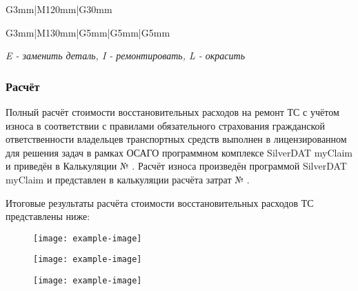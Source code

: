\begin{longtable}{G{3mm}|M{120mm}|G{30mm}}
\begin{longtable}{G{3mm}|M{130mm}|G{5mm}|G{5mm}|G{5mm}}
	 
	
	\textit{E - заменить деталь, I - ремонтировать, L - окрасить}
	
	
	\renewcommand\baselinestretch{1.2}\small\normalsize

\subsubsection{ Расчёт}
    
\indent Полный расчёт стоимости восстановительных расходов на ремонт ТС с учётом износа в соответствии с правилами обязательного страхования гражданской ответственности владельцев транспортных средств выполнен в  лицензированном для решения задач в рамках ОСАГО программном комплексе   SilverDAT myClaim и приведён в Калькуляции № \NomerDoc.
 Расчёт износа произведён программой  SilverDAT myClaim и представлен  в калькуляции расчёта затрат № \NomerDoc.
 
\indent Итоговые результаты расчёта  стоимости восстановительных расходов ТС \, \, представлены ниже:\\
  
  
\begin{figure}[H]
        	\centering
        	\texttt{[image: example-image]}
        \end{figure}
  
    \begin{figure}[H]
    	\centering
    	\texttt{[image: example-image]}
    \end{figure}
    \begin{figure}[H]
    	\centering
    	\texttt{[image: example-image]}
    \end{figure}
    \medskip
    \renewcommand\baselinestretch{1.2}\small\normalsize


\end{longtable}
\end{longtable}
